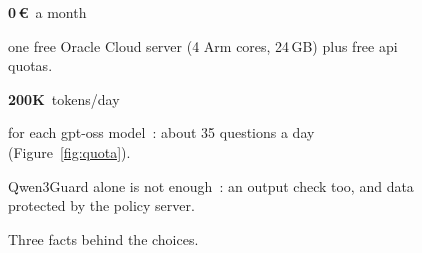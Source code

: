\begin{figure}[H]
  \centering
  \begin{tcbraster}[raster columns=3, cardgrid, raster before skip=0pt]
    \begin{tcolorbox}[card]
      {\color{accent}\LARGE\bfseries 0\,€}\,{\color{accent} a month}\par
      one free Oracle Cloud server (4 Arm cores, 24\,GB) plus free \acs{api} quotas.
    \end{tcolorbox}
    \begin{tcolorbox}[card]
      {\color{accent}\LARGE\bfseries 200K}\,{\color{accent} tokens/day}\par
      for each gpt-oss model~\cite{groq2026limits}: about 35 questions a day
      (Figure~\ref{fig:quota}).
    \end{tcolorbox}
    \begin{tcolorbox}[card]
      \par
      Qwen3Guard alone is not enough~\cite{young2025guardrails}: an output check
      too, and data protected by the policy server.
    \end{tcolorbox}
  \end{tcbraster}
  \caption{Three facts behind the choices.}
  \label{fig:model-facts}
\end{figure}
